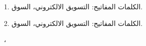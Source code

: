 \documentclass{article}
\begin{document}
\Huge

1. \textarabic{الكلمات المفاتيح: التسويق الالكتروني، السوق.} \\

\begin{Arabic}
2.
الكلمات المفاتيح: التسويق الالكتروني، السوق.

،

\end{Arabic}
\end{document}
